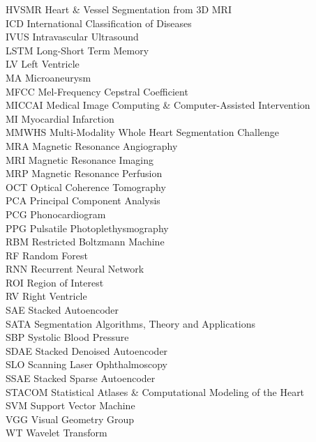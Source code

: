 \begin{tabbing}
	HVSMR \> Heart \& Vessel Segmentation from 3D MRI \\
	ICD \> International Classification of Diseases \\
	IVUS \> Intravascular Ultrasound \\
	LSTM \> Long-Short Term Memory \\
	LV \> Left Ventricle \\
	MA \> Microaneurysm \\
	MFCC \> Mel-Frequency Cepstral Coefficient \\
	MICCAI \> Medical Image Computing \& Computer-Assisted Intervention \\
	MI \> Myocardial Infarction \\
	MMWHS \> Multi-Modality Whole Heart Segmentation Challenge \\
	MRA \> Magnetic Resonance Angiography \\
	MRI \> Magnetic Resonance Imaging \\
	MRP \> Magnetic Resonance Perfusion \\
	OCT \> Optical Coherence Tomography \\
	PCA \> Principal Component Analysis \\
	PCG \> Phonocardiogram \\
	PPG \> Pulsatile Photoplethysmography \\
	RBM \> Restricted Boltzmann Machine \\
	RF \> Random Forest \\
	RNN \> Recurrent Neural Network \\
	ROI \> Region of Interest \\
	RV \> Right Ventricle \\
	SAE \> Stacked Autoencoder \\
	SATA \> Segmentation Algorithms, Theory and Applications \\
	SBP \> Systolic Blood Pressure \\
	SDAE \> Stacked Denoised Autoencoder \\
	SLO \> Scanning Laser Ophthalmoscopy \\
	SSAE \> Stacked Sparse Autoencoder \\
	STACOM \> Statistical Atlases \& Computational Modeling of the Heart \\
	SVM \> Support Vector Machine \\
	VGG \> Visual Geometry Group \\
	WT \> Wavelet Transform \\
\end{tabbing}
